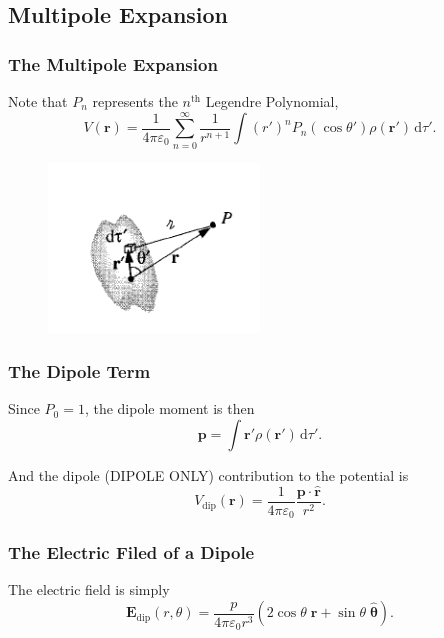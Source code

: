 \documentclass[12pt,english]{article}
\newcommand{\dmr}[1]{\, \mathrm{d}#1} %
\numberwithin{equation}{subsection}
\let\oldhat\hat
\renewcommand{\vec}[1]{\mathbf{#1}}
\renewcommand{\hat}[1]{\oldhat{\mathbf{#1}}}
\begin{document}
\subsection{Multipole Expansion}
\subsubsection{The Multipole Expansion}
Note that $P_n$ represents the $n^{\text{th}}$ Legendre Polynomial,
\begin{equation}
    V(\vec{r})=\frac{1}{4\pi\varepsilon_0} \sum_{n=0}^{\infty}\frac{1}{r^{n+1}}\int(r')^{n}P_n(\cos \theta')\rho(\vec{r}')\dmr{\tau'}.
\end{equation}

\begin{figure}[H]
    \centering
    \includegraphics[width =0.5\textwidth]{multipole.png}
\end{figure}

\subsubsection{The Dipole Term}
Since $P_0 = 1$, the dipole moment is then 
\begin{equation}
    \vec{p} = \int \vec{r'} \rho(\vec{r'}) \dmr{\tau'}.
\end{equation}

And the dipole (DIPOLE ONLY) contribution to the potential is
\begin{equation}
    V_{\text{dip}}(\vec{r}) = \frac{1}{4 \pi \varepsilon_0} \frac{\vec{p}\cdot\hat{r}}{r^2}.
\end{equation}

\subsubsection{The Electric Filed of a Dipole}
The electric field is simply 
\begin{equation}
    \vec{E}_{\text{dip}}(r,\theta)=\frac{p}{4 \pi \varepsilon_0 r^3}(2\cos \theta \; \hat{r} + \sin \theta \; \hat{\boldsymbol\theta}).
\end{equation}
\end{document}
